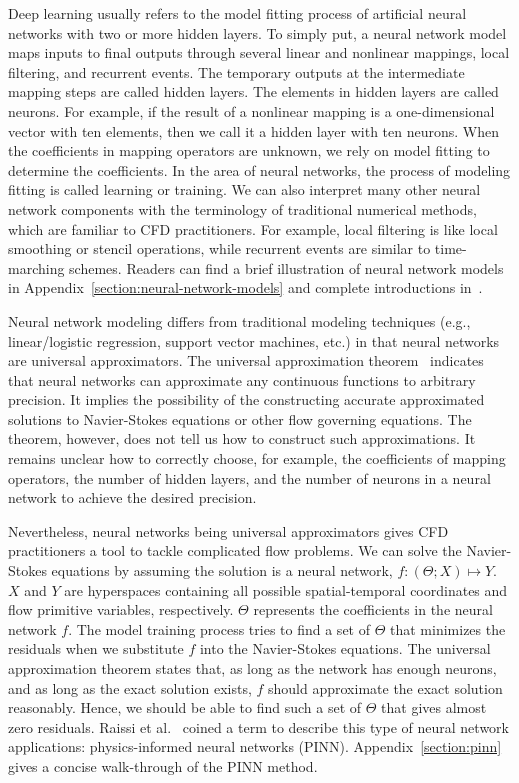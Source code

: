 
Deep learning usually refers to the model fitting process of artificial neural networks with two or more hidden layers.
To simply put, a neural network model maps inputs to final outputs through several linear and nonlinear mappings, local filtering, and recurrent events.
The temporary outputs at the intermediate mapping steps are called hidden layers.
The elements in hidden layers are called neurons.
For example, if the result of a nonlinear mapping is a one-dimensional vector with ten elements, then we call it a hidden layer with ten neurons.
When the coefficients in mapping operators are unknown, we rely on model fitting to determine the coefficients.
In the area of neural networks, the process of modeling fitting is called learning or training.
We can also interpret many other neural network components with the terminology of traditional numerical methods, which are familiar to CFD practitioners.
For example, local filtering is like local smoothing or stencil operations, while recurrent events are similar to time-marching schemes.
Readers can find a brief illustration of neural network models in Appendix~\ref{section:neural-network-models} and complete introductions in~\cite{nielsen_neural_2015, goodfellow_deep_2016}.

Neural network modeling differs from traditional modeling techniques (e.g., linear/logistic regression, support vector machines, etc.) in that neural networks are universal approximators.
The universal approximation theorem~\cite{nielsen_neural_2015, hornik_approximation_1991} indicates that neural networks can approximate any continuous functions to arbitrary precision.
It implies the possibility of the constructing accurate approximated solutions to Navier-Stokes equations or other flow governing equations.
The theorem, however, does not tell us how to construct such approximations.
It remains unclear how to correctly choose, for example, the coefficients of mapping operators, the number of hidden layers, and the number of neurons in a neural network to achieve the desired precision.

Nevertheless, neural networks being universal approximators gives CFD practitioners a tool to tackle complicated flow problems.
We can solve the Navier-Stokes equations by assuming the solution is a neural network, $f: (\Theta; X)\mapsto Y$.
$X$ and $Y$ are hyperspaces containing all possible spatial-temporal coordinates and flow primitive variables, respectively.
$\Theta$ represents the coefficients in the neural network $f$.
The model training process tries to find a set of $\Theta$ that minimizes the residuals when we substitute $f$ into the Navier-Stokes equations.
The universal approximation theorem states that, as long as the network has enough neurons, and as long as the exact solution exists, $f$ should approximate the exact solution reasonably.
Hence, we should be able to find such a set of $\Theta$ that gives almost zero residuals.
Raissi et al.\@~\cite{raissi_physics-informed_2019} coined a term to describe this type of neural network applications: physics-informed neural networks (PINN).
Appendix~\ref{section:pinn} gives a concise walk-through of the PINN method.

